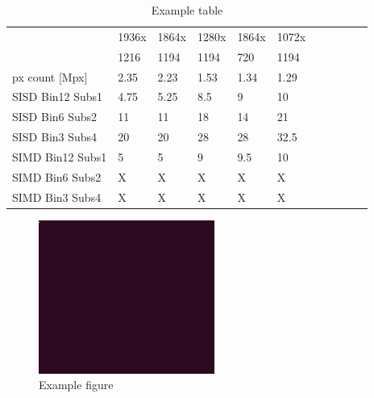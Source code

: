 \documentclass[11pt]{article}
\begin{document}
\begin{table}[ht]
    \centering
    \begin{tabular}{|l|l|l|l|l|l|l|l|l|l|l|}
        \hline
         & \textsf{1936x} & \textsf{1864x} & \textsf{1280x} & \textsf{1864x} & \textsf{1072x} \\
         & \textsf{1216}  & \textsf{1194}  & \textsf{1194}  & \textsf{720}   & \textsf{1194}  \\
        \hline
        px count [Mpx] & 2.35 & 2.23 & 1.53 & 1.34 & 1.29 \\
        \hline
        \hline
        \hline
        SISD Bin12 Subs1 & 4.75  & 5.25  & 8.5   & 9     & 10    \\ \hline
        SISD Bin6 Subs2  & 11    & 11    & 18    & 14    & 21    \\ \hline
        SISD Bin3 Subs4  & 20    & 20    & 28    & 28    & 32.5  \\
        \hline                                                                 
        \hline                                                                 
        SIMD Bin12 Subs1 & 5     & 5     & 9     & 9.5   & 10    \\ \hline
        SIMD Bin6 Subs2  & X     & X     & X     & X     & X     \\ \hline
        SIMD Bin3 Subs4  & X     & X     & X     & X     & X     \\ \hline
    \end{tabular}
    \caption{Example table}
\end{table}

\begin{figure}[htb]
    \centering
    \includegraphics[width=.35\linewidth]{example-image.png}
    \caption{Example figure}
    \label{fig:fig}
\end{figure}
\end{document}
